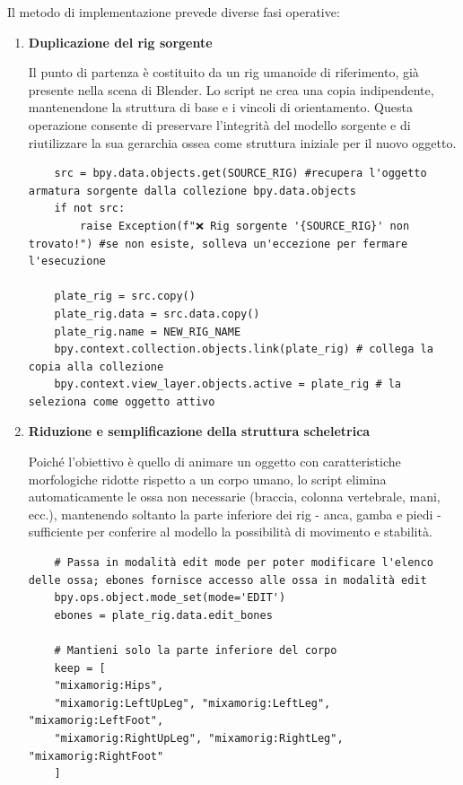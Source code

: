 Il metodo di implementazione prevede diverse fasi operative:

\begin{enumerate}
    \item \textbf{Duplicazione del rig sorgente}

    Il punto di partenza è costituito da un rig umanoide di riferimento, già presente nella scena di Blender. Lo script ne crea una copia indipendente, mantenendone la struttura di base e i vincoli di orientamento. Questa operazione consente di preservare l'integrità del modello sorgente e di riutilizzare la sua gerarchia ossea come struttura iniziale per il nuovo oggetto.

    \begin{verbatim}
    src = bpy.data.objects.get(SOURCE_RIG) #recupera l'oggetto armatura sorgente dalla collezione bpy.data.objects
    if not src:
        raise Exception(f"❌ Rig sorgente '{SOURCE_RIG}' non trovato!") #se non esiste, solleva un'eccezione per fermare l'esecuzione
    
    plate_rig = src.copy()
    plate_rig.data = src.data.copy()
    plate_rig.name = NEW_RIG_NAME
    bpy.context.collection.objects.link(plate_rig) # collega la copia alla collezione
    bpy.context.view_layer.objects.active = plate_rig # la seleziona come oggetto attivo
    \end{verbatim}

    \item \textbf{Riduzione e semplificazione della struttura scheletrica}

    Poiché l'obiettivo è quello di animare un oggetto con caratteristiche morfologiche ridotte rispetto a un corpo umano, lo script elimina automaticamente le ossa non necessarie (braccia, colonna vertebrale, mani, ecc.), mantenendo soltanto la parte inferiore dei rig - anca, gamba e piedi - sufficiente per conferire al modello la possibilità di movimento e stabilità.

    \begin{verbatim}
    # Passa in modalità edit mode per poter modificare l'elenco delle ossa; ebones fornisce accesso alle ossa in modalità edit
    bpy.ops.object.mode_set(mode='EDIT')
    ebones = plate_rig.data.edit_bones

    # Mantieni solo la parte inferiore del corpo
    keep = [
    "mixamorig:Hips",
    "mixamorig:LeftUpLeg", "mixamorig:LeftLeg", "mixamorig:LeftFoot",
    "mixamorig:RightUpLeg", "mixamorig:RightLeg", "mixamorig:RightFoot"
    ]
    \end{verbatim}


\end{enumerate}
